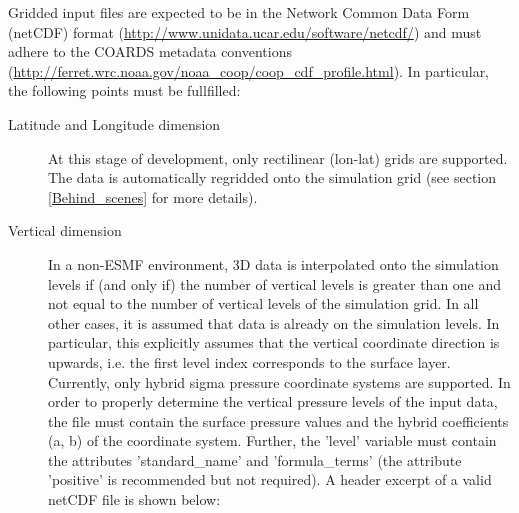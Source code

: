 \documentclass[12pt,a4paper]{article} %
\begin{document}
Gridded input files are expected to be in the Network Common Data Form (netCDF) format (\url{http://www.unidata.ucar.edu/software/netcdf/}) and must adhere to the COARDS metadata conventions (\url{http://ferret.wrc.noaa.gov/noaa_coop/coop_cdf_profile.html}). In particular, the following points must be fullfilled:
\begin{description}
\item [Latitude and Longitude dimension] At this stage of development, only rectilinear (lon-lat) grids are supported. The data is automatically regridded onto the simulation grid (see section \ref{Behind_scenes} for more details).
\item [Vertical dimension] In a non-ESMF environment, 3D data is interpolated onto the simulation levels if (and only if) the number of vertical levels is greater than one and not equal to the number of vertical levels of the simulation grid. In all other cases, it is assumed that data is already on the simulation levels. In particular, this explicitly assumes that the vertical coordinate direction is upwards, i.e. the first level index corresponds to the surface layer. Currently, only hybrid sigma pressure coordinate systems are supported. In order to properly determine the vertical pressure levels of the input data, the file must contain the surface pressure values and the hybrid coefficients (a, b) of the coordinate system. Further, the 'level' variable must contain the attributes 'standard\_name' and 'formula\_terms' (the attribute 'positive' is recommended but not required). A header excerpt of a valid netCDF file is shown below:\\


\end{description}
\end{document}

